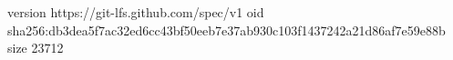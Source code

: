 version https://git-lfs.github.com/spec/v1
oid sha256:db3dea5f7ac32ed6cc43bf50eeb7e37ab930c103f1437242a21d86af7e59e88b
size 23712
